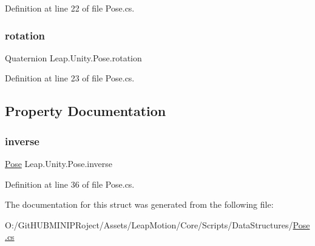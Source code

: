 Definition at line 22 of file Pose.\+cs.

\mbox{\label{struct_leap_1_1_unity_1_1_pose_a59e70598d0ebe38d79a55b88b51734ad}} 
\subsubsection{\texorpdfstring{rotation}{rotation}}
{\footnotesize\ttfamily Quaternion Leap.\+Unity.\+Pose.\+rotation}



Definition at line 23 of file Pose.\+cs.



\subsection{Property Documentation}
\mbox{\label{struct_leap_1_1_unity_1_1_pose_a223dfc83da978c0ac8f02683acbdc070}} 
\subsubsection{\texorpdfstring{inverse}{inverse}}
{\footnotesize\ttfamily \mbox{\hyperlink{struct_leap_1_1_unity_1_1_pose}{Pose}} Leap.\+Unity.\+Pose.\+inverse\hspace{0.3cm}{\ttfamily [get]}}



Definition at line 36 of file Pose.\+cs.



The documentation for this struct was generated from the following file\+:\begin{DoxyCompactItemize}
\item 
O\+:/\+Git\+H\+U\+B\+M\+I\+N\+I\+P\+Roject/\+Assets/\+Leap\+Motion/\+Core/\+Scripts/\+Data\+Structures/\mbox{\hyperlink{_pose_8cs}{Pose.\+cs}}\end{DoxyCompactItemize}
